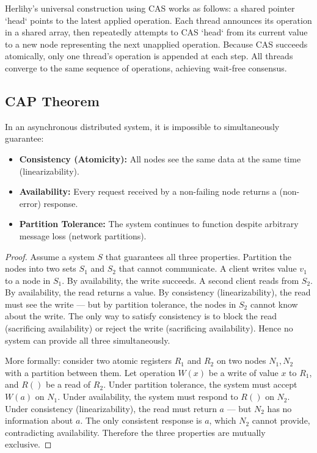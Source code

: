 \begin{example}
Herlihy's universal construction using CAS works as follows: a shared pointer `head` points to the latest applied operation. Each thread announces its operation in a shared array, then repeatedly attempts to CAS `head` from its current value to a new node representing the next unapplied operation. Because CAS succeeds atomically, only one thread's operation is appended at each step. All threads converge to the same sequence of operations, achieving wait-free consensus.
\end{example}

\subsection{CAP Theorem}
\label{sec:consensus:cap}

\begin{theorem}
In an asynchronous distributed system, it is impossible to simultaneously guarantee:
\begin{itemize}
\item \textbf{Consistency (Atomicity):} All nodes see the same data at the same time (linearizability).
\item \textbf{Availability:} Every request received by a non-failing node returns a (non-error) response.
\item \textbf{Partition Tolerance:} The system continues to function despite arbitrary message loss (network partitions).
\end{itemize}
\end{theorem}

\begin{proof}
Assume a system $S$ that guarantees all three properties. Partition the nodes into two sets $S_1$ and $S_2$ that cannot communicate. A client writes value $v_1$ to a node in $S_1$. By availability, the write succeeds. A second client reads from $S_2$. By availability, the read returns a value. By consistency (linearizability), the read must see the write — but by partition tolerance, the nodes in $S_2$ cannot know about the write. The only way to satisfy consistency is to block the read (sacrificing availability) or reject the write (sacrificing availability). Hence no system can provide all three simultaneously.

More formally: consider two atomic registers $R_1$ and $R_2$ on two nodes $N_1, N_2$ with a partition between them. Let operation $W(x)$ be a write of value $x$ to $R_1$, and $R()$ be a read of $R_2$. Under partition tolerance, the system must accept $W(a)$ on $N_1$. Under availability, the system must respond to $R()$ on $N_2$. Under consistency (linearizability), the read must return $a$ — but $N_2$ has no information about $a$. The only consistent response is $a$, which $N_2$ cannot provide, contradicting availability. Therefore the three properties are mutually exclusive.
\end{proof}

